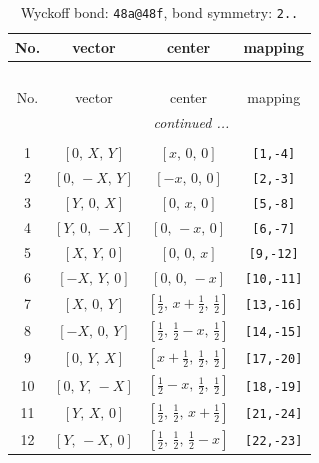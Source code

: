 \documentclass[fleqn,8pt]{jsarticle}
\begin{document}
\begin{longtable}{cccc}
\caption{Wyckoff bond: {\tt 48a@48f}, bond symmetry: {\tt 2..}}
 \\
 \hline \hline
No. & vector & center & mapping \\ \hline \endfirsthead

\multicolumn{3}{l}{\tablename\ \thetable{}} \\
 \hline \hline
No. & vector & center & mapping \\ \hline \endhead

 \hline \hline
\multicolumn{3}{r}{\footnotesize\it continued ...} \\ \endfoot

 \hline \hline
\multicolumn{3}{r}{} \\ \endlastfoot

1 & $\left[ 0,\, X,\, Y \right]$ & $\left[ x,\, 0,\, 0 \right]$ & {\tt [1,-4]} \\ \hline
2 & $\left[ 0,\, - X,\, Y \right]$ & $\left[ - x,\, 0,\, 0 \right]$ & {\tt [2,-3]} \\ \hline
3 & $\left[ Y,\, 0,\, X \right]$ & $\left[ 0,\, x,\, 0 \right]$ & {\tt [5,-8]} \\ \hline
4 & $\left[ Y,\, 0,\, - X \right]$ & $\left[ 0,\, - x,\, 0 \right]$ & {\tt [6,-7]} \\ \hline
5 & $\left[ X,\, Y,\, 0 \right]$ & $\left[ 0,\, 0,\, x \right]$ & {\tt [9,-12]} \\ \hline
6 & $\left[ - X,\, Y,\, 0 \right]$ & $\left[ 0,\, 0,\, - x \right]$ & {\tt [10,-11]} \\ \hline
7 & $\left[ X,\, 0,\, Y \right]$ & $\left[ \frac{1}{2},\, x + \frac{1}{2},\, \frac{1}{2} \right]$ & {\tt [13,-16]} \\ \hline
8 & $\left[ - X,\, 0,\, Y \right]$ & $\left[ \frac{1}{2},\, \frac{1}{2} - x,\, \frac{1}{2} \right]$ & {\tt [14,-15]} \\ \hline
9 & $\left[ 0,\, Y,\, X \right]$ & $\left[ x + \frac{1}{2},\, \frac{1}{2},\, \frac{1}{2} \right]$ & {\tt [17,-20]} \\ \hline
10 & $\left[ 0,\, Y,\, - X \right]$ & $\left[ \frac{1}{2} - x,\, \frac{1}{2},\, \frac{1}{2} \right]$ & {\tt [18,-19]} \\ \hline
11 & $\left[ Y,\, X,\, 0 \right]$ & $\left[ \frac{1}{2},\, \frac{1}{2},\, x + \frac{1}{2} \right]$ & {\tt [21,-24]} \\ \hline
12 & $\left[ Y,\, - X,\, 0 \right]$ & $\left[ \frac{1}{2},\, \frac{1}{2},\, \frac{1}{2} - x \right]$ & {\tt [22,-23]} \\
\end{longtable}
\end{document}
